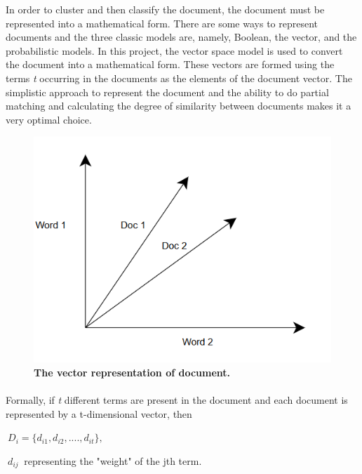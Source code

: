 \documentclass[12pt]{report}
\begin{document}
        In order to cluster and then classify the document, the document must be represented into a mathematical form. There are some ways to represent documents and the three classic models are, namely,
        Boolean, the vector, and the probabilistic models\cite{baeza1999modern}. In this project, the vector space model is used\cite{salton1975vector} to convert the document into a mathematical form. These vectors are formed using the terms \emph{t} occurring in the documents
        as the elements of the document vector. The simplistic approach to represent the document and the ability to do partial matching and calculating the degree
        of similarity between documents makes it a very optimal choice.
        \begin{figure}[h]
            \centering
            \includegraphics[scale=0.7]{vectorrep.png}
            \caption{\textbf{The vector representation of document.}}
        \end{figure}
        \paragraph{}Formally, if \emph{t} different terms are present in the document and each document is represented by a t-dimensional vector, then

        \begin{center}

          $~{D_i = \{d_{i1}, d_{i2},....,d_{it}\} ,}~$

        \end{center}

        $~{d_{ij}}~$ representing the "weight" of the jth term\cite{salton1975vector}.
\end{document}

